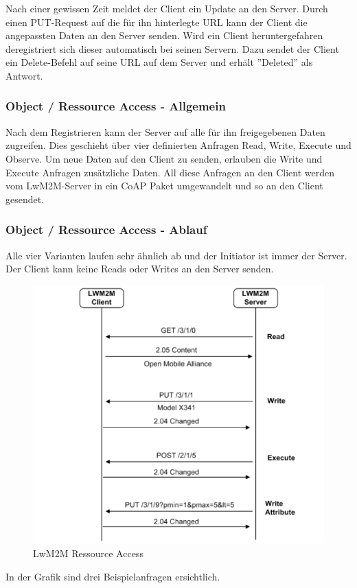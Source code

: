 Nach einer gewissen Zeit meldet der Client ein Update an den Server. Durch einen PUT-Request auf die für ihn hinterlegte URL kann der Client die angepassten Daten an den Server senden. Wird ein Client heruntergefahren deregistriert sich dieser automatisch bei seinen Servern. Dazu sendet der Client ein Delete-Befehl auf seine URL auf dem Server und erhält ''Deleted'' als Antwort. 

\subsubsection{Object / Ressource Access - Allgemein}
Nach dem Registrieren kann der Server auf alle für ihn freigegebenen Daten zugreifen. Dies geschieht über vier definierten Anfragen Read, Write, Execute und Observe. Um neue Daten auf den Client zu senden, erlauben die Write und Execute Anfragen zusätzliche Daten. All diese Anfragen an den Client werden vom LwM2M-Server in ein CoAP Paket umgewandelt und so an den Client gesendet.
\subsubsection{Object / Ressource Access - Ablauf}
Alle vier Varianten laufen sehr ähnlich ab und der Initiator ist immer der Server. Der Client kann keine Reads oder Writes an den Server senden.
\begin{figure}[H]
\includegraphics[scale=0.65]{../02_Analyse/images/lwm2m/command_diagram.png}
\caption{LwM2M Ressource Access\cite{LwM2MInterfaces}}
\end{figure}
In der Grafik sind drei Beispielanfragen ersichtlich.

